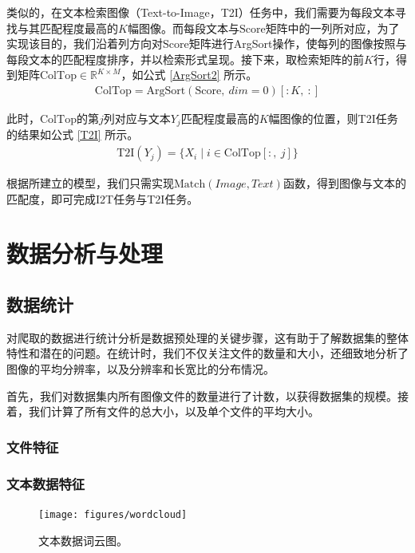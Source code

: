 \documentclass[a4paper]{zreport}
\begin{document}
类似的，在文本检索图像（Text-to-Image，T2I）任务中，我们需要为每段文本寻找与其匹配程度最高的$K$幅图像。而每段文本与$\mathrm{Score}$矩阵中的一列所对应，为了实现该目的，我们沿着列方向对$\mathrm{Score}$矩阵进行ArgSort操作，使每列的图像按照与每段文本的匹配程度排序，并以检索形式呈现。接下来，取检索矩阵的前$K$行，得到矩阵$\mathrm{ColTop} \in \mathbb{R}^{K \times M}$，如公式 \eqref{ArgSort2} 所示。
\begin{gather}
\mathrm{ColTop} = \mathrm{ArgSort}\left(\mathrm{Score},~dim=0\right)\left[:K,~:\right]
\label{ArgSort2}
\end{gather}

此时，$\mathrm{ColTop}$的第$j$列对应与文本$Y_j$匹配程度最高的$K$幅图像的位置，则T2I任务的结果如公式 \eqref{T2I} 所示。
\begin{gather}
\mathrm{T2I}\left(Y_j\right) = \{X_i\mid i \in \mathrm{ColTop}\left[:,~j\right]\}\label{T2I}
\end{gather}

根据所建立的模型，我们只需实现$\mathrm{Match}\left(Image, Text\right)$函数，得到图像与文本的匹配度，即可完成I2T任务与T2I任务。


\section{数据分析与处理}

\subsection{数据统计}

对爬取的数据进行统计分析是数据预处理的关键步骤，这有助于了解数据集的整体特性和潜在的问题。在统计时，我们不仅关注文件的数量和大小，还细致地分析了图像的平均分辨率，以及分辨率和长宽比的分布情况。

首先，我们对数据集内所有图像文件的数量进行了计数，以获得数据集的规模。接着，我们计算了所有文件的总大小，以及单个文件的平均大小。

\subsubsection{文件特征}

\subsubsection{文本数据特征}

\begin{figure}[h]
\centering
\texttt{[image: figures/wordcloud]}
\caption{文本数据词云图。}
\label{fig:wordcloud}
\end{figure}
\end{document}
